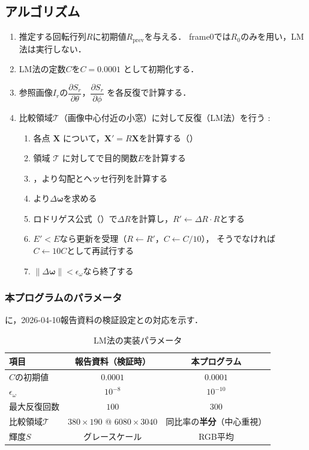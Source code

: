 \documentclass{ltjsarticle}          %
\begin{document}
\subsection{アルゴリズム}
\begin{enumerate}
  \item 推定する回転行列$R$に初期値$R_{\mathrm{prev}}$を与える．
    frame0では$R_0$のみを用い，LM法は実行しない．

  \item LM法の定数$C$を$C = 0.0001$ として初期化する．

  \item 参照画像$I_r$の$\dfrac{\partial S_r}{\partial \theta}$，$\dfrac{\partial S_r}{\partial \phi}$
    を各反復で計算する．

  \item 比較領域$\mathcal{T}$（画像中心付近の小窓）に対して反復（LM法）を行う :
    \begin{enumerate}
      \item 各点 $\bm{X}$ について，$\bm{X}' = R\bm{X}$を計算する（）
      \item 領域 $\mathcal{T}$ に対してで目的関数$E$を計算する
      \item {}，より勾配とヘッセ行列を計算する
      \item {}より$\Delta\bm{\omega}$を求める
      \item ロドリゲス公式（）で$\Delta R$を計算し，$R' \leftarrow \Delta R \cdot R$とする
      \item $E' < E$なら更新を受理（$R \leftarrow R'$，$C \leftarrow C/10$），
        そうでなければ$C \leftarrow 10C$として再試行する
      \item $\|\Delta\bm{\omega}\| < \epsilon_\omega$なら終了する
    \end{enumerate}
\end{enumerate}

\subsubsection{本プログラムのパラメータ}
に，2026-04-10報告資料の検証設定との対応を示す．

\begin{table}[H]
  \centering
  \caption{LM法の実装パラメータ}
  \label{tab:lm_params}
  \begin{tabular}{l|c|c}
    \hline
    項目 & 報告資料（検証時） & 本プログラム \\
    \hline
    $C$の初期値 & $0.0001$ & $0.0001$ \\
    $\epsilon_\omega$ & $10^{-8}$ & $10^{-10}$ \\
    最大反復回数 & $100$ & $300$ \\
    比較領域$\mathcal{T}$ &
      $380 \times 190$ @ $6080 \times 3040$ &
      同比率の\textbf{半分}（中心重視） \\
    輝度$S$ & グレースケール & RGB平均 \\
    \hline
  \end{tabular}
\end{table}
\end{document}
